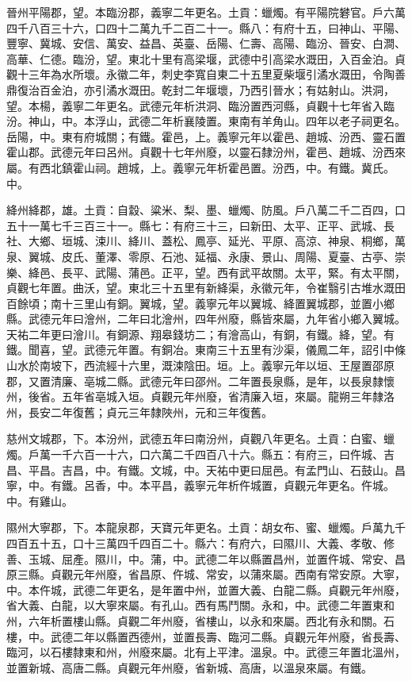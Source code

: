 \begin{pinyinscope}
 晉州平陽郡，望。本臨汾郡，義寧二年更名。土貢：蠟燭。有平陽院礬官。戶六萬四千八百三十六，口四十二萬九千二百二十一。縣八：有府十五，曰神山、平陽、豐寧、冀城、安信、萬安、益昌、英臺、岳陽、仁壽、高陽、臨汾、晉安、白澗、高華、仁德。臨汾，望。東北十里有高梁堰，武德中引高梁水溉田，入百金泊。貞觀十三年為水所壞。永徽二年，刺史李寬自東二十五里夏柴堰引潏水溉田，令陶善鼎復治百金泊，亦引潏水溉田。乾封二年堰壞，乃西引晉水；有姑射山。洪洞，望。本楊，義寧二年更名。武德元年析洪洞、臨汾置西河縣，貞觀十七年省入臨汾。神山，中。本浮山，武德二年析襄陵置。東南有羊角山。四年以老子祠更名。岳陽，中。東有府城關；有鐵。霍邑，上。義寧元年以霍邑、趙城、汾西、靈石置霍山郡。武德元年曰呂州。貞觀十七年州廢，以靈石隸汾州，霍邑、趙城、汾西來屬。有西北鎮霍山祠。趙城，上。義寧元年析霍邑置。汾西，中。有鐵。冀氏。中。



 絳州絳郡，雄。土貢：自縠、粱米、梨、墨、蠟燭、防風。戶八萬二千二百四，口五十一萬七千三百三十一。縣七：有府三十三，曰新田、太平、正平、武城、長社、大鄉、垣城、涑川、絳川、蓋松、鳳亭、延光、平原、高涼、神泉、桐鄉，萬泉、翼城、皮氏、董澤、零原、石池、延福、永康、景山、周陽、夏臺、古亭、崇樂、絳邑、長平、武陽、蒲邑。正平，望。西有武平故關。太平，緊。有太平關，貞觀七年置。曲沃，望。東北三十五里有新絳渠，永徽元年，令崔翳引古堆水溉田百餘頃；南十三里山有銅。翼城，望。義寧元年以翼城、絳置翼城郡，並置小鄉縣。武德元年曰澮州，二年曰北澮州，四年州廢，縣皆來屬，九年省小鄉入翼城。天祐二年更曰澮川。有銅源、翔皋錢坊二；有澮高山，有銅，有鐵。絳，望。有鐵。聞喜，望。武德元年置。有銅冶。東南三十五里有沙渠，儀鳳二年，詔引中條山水於南坡下，西流經十六里，溉涑陰田。垣。上。義寧元年以垣、王屋置邵原郡，又置清廉、亳城二縣。武德元年曰邵州。二年置長泉縣，是年，以長泉隸懷州，後省。五年省亳城入垣。貞觀元年州廢，省清廉入垣，來屬。龍朔三年隸洛州，長安二年復舊；貞元三年隸陜州，元和三年復舊。



 慈州文城郡，下。本汾州，武德五年曰南汾州，貞觀八年更名。土貢：白蜜、蠟燭。戶萬一千六百一十六，口六萬二千四百八十六。縣五：有府三，曰仵城、吉昌、平昌。吉昌，中。有鐵。文城，中。天祐中更曰屈邑。有孟門山、石鼓山。昌寧，中。有鐵。呂香，中。本平昌，義寧元年析仵城置，貞觀元年更名。仵城。中。有雞山。



 隰州大寧郡，下。本龍泉郡，天寶元年更名。土貢：胡女布、蜜、蠟燭。戶萬九千四百五十五，口十三萬四千四百二十。縣六：有府六，曰隰川、大義、孝敬、修善、玉城、屈產。隰川，中。蒲，中。武德二年以縣置昌州，並置仵城、常安、昌原三縣。貞觀元年州廢，省昌原、仵城、常安，以蒲來屬。西南有常安原。大寧，中。本仵城，武德二年更名，是年置中州，並置大義、白龍二縣。貞觀元年州廢，省大義、白龍，以大寧來屬。有孔山。西有馬鬥關。永和，中。武德二年置東和州，六年析置樓山縣。貞觀二年州廢，省樓山，以永和來屬。西北有永和關。石樓，中。武德二年以縣置西德州，並置長壽、臨河二縣。貞觀元年州廢，省長壽、臨河，以石樓隸東和州，州廢來屬。北有上平津。溫泉。中。武德三年置北溫州，並置新城、高唐二縣。貞觀元年州廢，省新城、高唐，以溫泉來屬。有鐵。




\end{pinyinscope}
